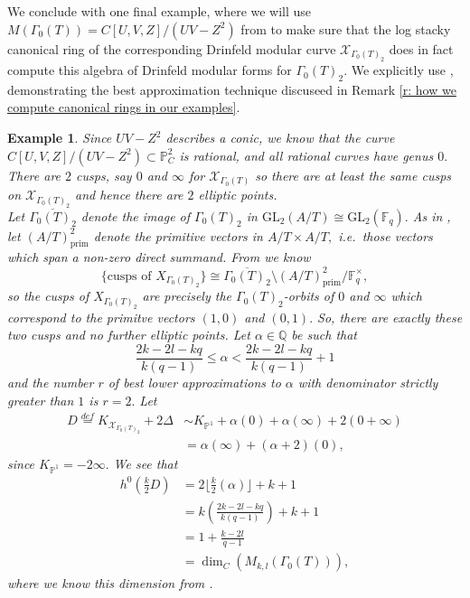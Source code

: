 \documentclass[11pt]{amsart}
\newtheorem{example}[theorem]{Example}
\theoremstyle{definition}
\numberwithin{equation}{section}
\newcommand{\GL}{\mathrm{GL}} 	%
\newcommand{\sX}{\mathscr{X}}		%
\newcommand{\bbF}{\mathbb{F}}		%
\newcommand{\bbP}{\mathbb{P}}		%
\newcommand{\bbQ}{\mathbb{Q}}		%
\begin{document}
We conclude with one final example, where we will use $M(\Gamma_0(T))=C[U,V,Z]/(UV-Z^2)$ from \cite[Theorem $4.4$]{Dalal-Kumar-Gamma_0(T)-structure} to make sure that the log stacky canonical ring of the corresponding Drinfeld modular curve $\sX_{\Gamma_0(T)_2}$ does in fact compute this algebra of Drinfeld modular forms for $\Gamma_0(T)_2.$ We explicitly use \cite[Theorem $6$]{ODorney-canonical-rings-Q-divisors-on-P1}, demonstrating the best approximation technique discuseed in Remark \ref{r: how we compute canonical rings in our examples}.
\begin{example}
	Since $UV-Z^2$ describes a conic, we know that the curve $C[U,V,Z]/(UV-Z^2)\subset\bbP^2_C$ is rational, and all rational curves have genus $0.$ There are $2$ cusps, say $0$ and $\infty$ for $\sX_{\Gamma_0(T)}$ so there are at least the same cusps on $\sX_{\Gamma_0(T)_2}$ and hence there are $2$ elliptic points.\\ 
	
	Let $\overline{\Gamma_0(T)_2}$ denote the image of $\Gamma_0(T)_2$ in $\GL_2(A/T)\cong \GL_2(\bbF_q).$ As in \cite[Section $3$]{Gekeler-Invariants}, let $(A/T)^2_{\text{prim}}$ denote the primitive vectors in $A/T\times A/T,$ i.e.\ those vectors which span a non-zero direct summand. From \cite[Section $3$]{Gekeler-Invariants} we know 
	\[\{\text{cusps of }X_{\Gamma_0(T)_2}\}\cong \overline{\Gamma_0(T)_2}\setminus (A/T)^2_{\text{prim}}/\bbF_q^{\times},\] so the cusps of $X_{\Gamma_0(T)_2}$ are precisely the $\Gamma_0(T)_2$-orbits of $0$ and $\infty$ which correspond to the primitve vectors $(1,0)$ and $(0,1).$ So, there are exactly these two cusps and no further elliptic points. Let $\alpha\in \bbQ$ be such that \[\frac{2k-2l-kq}{k(q-1)}\leq \alpha<\frac{2k-2l-kq}{k(q-1)}+1\] and the number $r$ of best lower approximations to $\alpha$ with denominator strictly greater than $1$ is $r=2.$ Let
	\begin{align*}
		D\overset{def}{=}K_{\sX_{\Gamma_0(T)_2}}+2\Delta&\sim K_{\bbP^1}+\alpha(0)+\alpha(\infty)+2(0+\infty)\\
		&=\alpha(\infty)+(\alpha+2)(0),
	\end{align*}
	since $K_{\bbP^1}= -2\infty.$ We see that 
	\begin{align*}
		h^0\left(\frac{k}{2}D\right)&=2\Big\lfloor\frac{k}{2}(\alpha)\Big\rfloor+k+1\\
		&=k\left(\frac{2k-2l-kq}{k(q-1)}\right)+k+1\\
		&=1+\frac{k-2l}{q-1}\\
		&=\dim_C(M_{k,l}(\Gamma_0(T))),
	\end{align*}
	where we know this dimension from \cite[Proposition $4.1$]{Dalal-Kumar-Gamma_0(T)-structure}.\\
	

\end{example}
\end{document}

